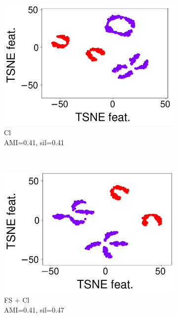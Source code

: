 \documentclass[runningheads]{llncs}
\begin{document}
\begin{figure}[t]
    \begin{subfigure}[t]{0.23\columnwidth}
        \centering
        \includegraphics[scale=.15]{img/cl.pdf}
        \caption{Cl \cite{Tschechlov2021}\\ \scriptsize{AMI=0.41, sil=0.41}}
        \label{fig:ca3}
    \end{subfigure}
    ~
    \begin{subfigure}[t]{0.23\columnwidth}
        \centering
        \includegraphics[scale=.15]{img/ft_cl.pdf}
        \caption{FS + Cl\\ \scriptsize{AMI=0.41, sil=0.47}}
        \label{fig:ca4}
    \end{subfigure}
    ~
    \begin{subfigure}[t]{0.2\columnwidth}

\end{subfigure}
\end{figure}
\end{document}
